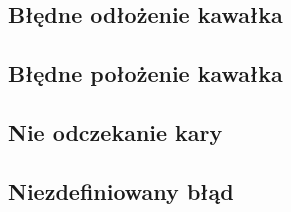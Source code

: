 \documentclass[Dokumentacja.tex]{subfiles}
\begin{document}
\subsection{Błędne odłożenie kawałka}


\subsection{Błędne położenie kawałka}


\subsection{Nie odczekanie kary}


\subsection{Niezdefiniowany błąd}

\end{document}
